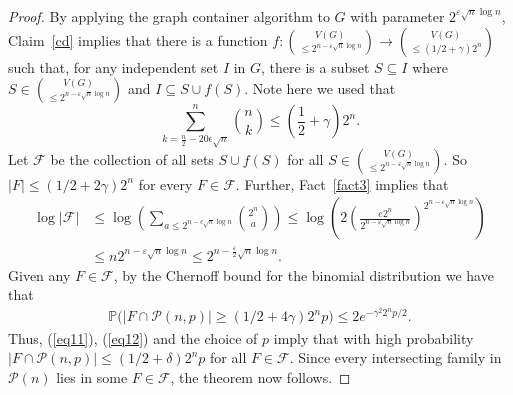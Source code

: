 \documentclass[11pt]{article}
\numberwithin{equation}{section}
\def\eps{\varepsilon}
\begin{document}
\begin{proof}

\medskip


By applying the graph container algorithm to $G$ with parameter $2^{\eps \sqrt{n} \log n}$, Claim~\ref{cd} implies that there is a function $f: \binom{V(G)}{\leq 2^{n-\eps \sqrt{n} \log n}} \rightarrow \binom{V(G)}{\leq (1/2+\gamma )2^n}$
such that, for any independent set $I$ in $G$, there is a subset $S \subseteq I$ where $S \in \binom{V(G)}{\leq 2^{n-\eps \sqrt{n} \log n}}$ and $I \subseteq S\cup f(S)$. Note  here we used that
$$ \sum_{k=\frac{n}{2}-20\epsilon\sqrt{n}}^n \binom{n}{k}\leq \left(\frac{1}{2}+\gamma\right)2^n.$$
Let $\mathcal F$ be the collection of all sets $S \cup f(S)$ for all $S \in \binom{V(G)}{\leq 2^{n-\eps \sqrt{n} \log n}}$. So  $|F|\leq (1/2+2\gamma )2^n$ for every $F \in \mathcal F$.
Further, Fact~\ref{fact3} implies that
\begin{align}
\log|\mathcal{F}|& \leq\log\left(\sum_{a\leq2^{n-\epsilon\sqrt{n}\log{n}}}\binom{2^n}{a} \right)\leq  \log \left(2\left(\frac{e2^n}{2^{n-\eps\sqrt{n}\log n}}\right)^{2^{n-\eps\sqrt{n}\log n}}\right) \nonumber\\ & 
\leq  n2^{n-\eps\sqrt{n}\log n}\leq 2^{n-\frac{\eps}{2}\sqrt{n}\log n}.\label{eq11}
\end{align}
Given any $F\in \mathcal F$, by the Chernoff bound for the binomial distribution we have that
\begin{align}\label{eq12}\mathbb P\bigl(|F \cap \mathcal P(n,p)|\geq (1/2+4 \gamma )2^n p\bigr) \leq 2 e^{-\gamma ^2 2^n p/2}.
\end{align}
Thus, (\ref{eq11}), (\ref{eq12}) and the choice of $p$ imply that with high probability $|F \cap \mathcal P(n,p)|\leq (1/2+\delta)2^n p$ for all $F \in \mathcal F$. Since every intersecting family in $\mathcal P(n)$ lies in some $F \in \mathcal F$, the 
theorem now follows.
\end{proof}



\end{document}
